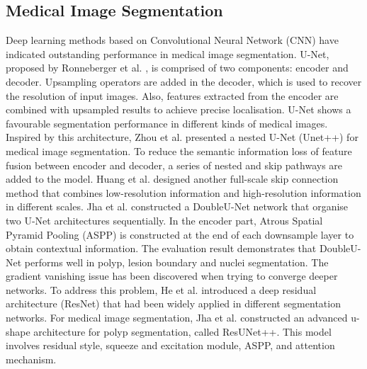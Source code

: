 \documentclass[a4paper,fleqn]{cas-dc}
\begin{document}
\subsection{Medical Image Segmentation}
Deep learning methods based on Convolutional Neural Network (CNN) have indicated outstanding performance in medical image segmentation. U-Net, proposed by Ronneberger et al. \cite{ronneberger2015u}, is comprised of two components: encoder and decoder. Upsampling operators are added in the decoder, which is used to recover the resolution of input images. Also, features extracted from the encoder are combined with upsampled results to achieve precise localisation. U-Net shows a favourable segmentation performance in different kinds of medical images. Inspired by this architecture, Zhou et al. \cite{zhou2018unet++} presented a nested U-Net (Unet++) for medical image segmentation. To reduce the semantic information loss of feature fusion between encoder and decoder, a series of nested and skip pathways are added to the model. Huang et al. \cite{huang2020unet} designed another full-scale skip connection method that combines low-resolution information and high-resolution information in different scales. Jha et al. \cite{jha2020doubleu} constructed a DoubleU-Net network that organise two U-Net architectures sequentially. In the encoder part, Atrous Spatial Pyramid Pooling (ASPP) is constructed at the end of each downsample layer to obtain contextual information. The evaluation result demonstrates that DoubleU-Net performs well in polyp, lesion boundary and nuclei segmentation. The gradient vanishing issue has been discovered when trying to converge deeper networks. To address this problem, He et al. \cite{he2016deep} introduced a deep residual architecture (ResNet) that had been widely applied in different segmentation networks. For medical image segmentation, Jha et al. \cite{jha2019resunet++} constructed an advanced u-shape architecture for polyp segmentation, called ResUNet++. This model involves residual style, squeeze and excitation module, ASPP, and attention mechanism.
\end{document}
